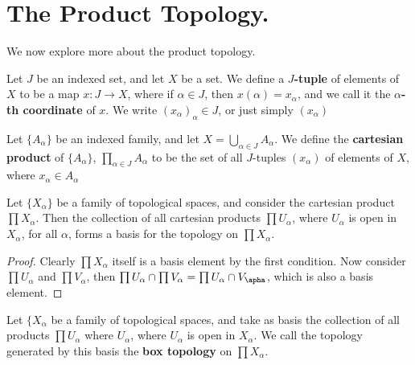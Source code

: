 
\section{The Product Topology.}

We now explore more about the product topology.

\begin{definition}
    Let $J$ be an indexed set, and let  $X$ be a set. We define a  \textbf{$J$-tuple} of elements of
    $X$ to be a map $x:J \rightarrow X$, where if  $\alpha \in J$, then  $x(\alpha)=x_{\alpha}$, and
    we call it the \textbf{$\alpha$-th coordinate} of $x$. We write  $(x_{\alpha})_\alpha \in J$, or
just simply $(x_{\alpha})$
\end{definition}

\begin{definition}
Let $\{A_{\alpha}\}$ be an indexed family, and let $X=\bigcup_{\alpha \in J}{A_{\alpha}}$. We define
the \textbf{cartesian product} of $\{A_{\alpha}\}$, $\prod_{\alpha \in J}{A_\alpha}$ to be the set of
all $J$-tuples  $(x_{\alpha})$ of elements of $X$, where  $x_{\alpha} \in A_{\alpha}$
\end{definition}

\begin{theorem}\label{2.1.1}
    Let $\{X_{\alpha}\}$ be a family of topological spaces, and consider the cartesian product
    $\prod{X_{\alpha}}$. Then the collection of all cartesian products $\prod{U_{\alpha}}$, where
    $U_{\alpha}$ is open in $X_{\alpha}$, for all $\alpha$, forms a basis for the topology on
    $\prod{X_{\alpha}}$.
\end{theorem}
\begin{proof}
    Clearly $\prod{X_{\alpha}}$ itself is a basis element by the first condition. Now consider
    $\prod{U_{\alpha}}$ and $\prod{V_{\alpha}}$, then $\prod{U_{\alpha}} \cap
    \prod{V_{\alpha}}=\prod{U_{\alpha} \cap V_{\apha}}$, which is also a basis element.
\end{proof}

\begin{definition}
Let $\{X_{\alpha}$ be a family of topological spaces, and take as basis the collection of all
    products $\prod{U_{\alpha}}$ where $U_{\alpha}$, where $U_{\alpha}$ is open in $X_{\alpha}$.
    We call the topology generated by this basis the \textbf{box topology} on $\prod{X_{\alpha}}$.		
\end{definition}

